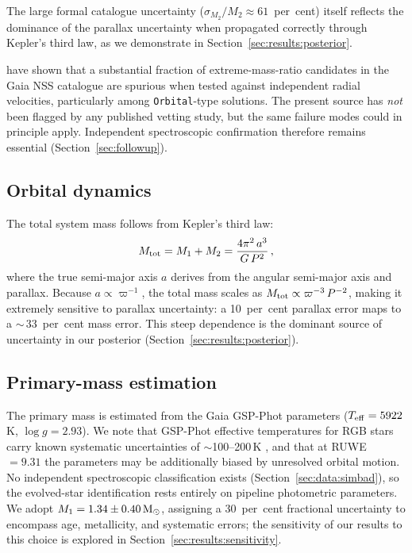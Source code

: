 \documentclass[usenatbib,fleqn]{mnras}
\newcommand{\Msun}{{\rm M}_\odot}
\begin{document}
The large formal catalogue uncertainty ($\sigma_{M_2}/M_2 \approx
61$~per~cent) itself reflects the dominance of the parallax
uncertainty when propagated correctly through Kepler's third law,
as we demonstrate in Section~\ref{sec:results:posterior}.

\citet{ElBadry2024} have shown that a substantial fraction of
extreme-mass-ratio candidates in the Gaia NSS catalogue are
spurious when tested against independent radial velocities,
particularly among \texttt{Orbital}-type solutions.  The
present source has \emph{not} been flagged by any published
vetting study, but the same failure modes could in
principle apply.  Independent spectroscopic confirmation therefore
remains essential (Section~\ref{sec:followup}).

\subsection{Orbital dynamics}
\label{sec:methods:orbit}

The total system mass follows from Kepler's third law:
\begin{equation}
M_{\rm tot} = M_1 + M_2 = \frac{4\pi^2\,a^3}{G\,P^2}\,,
\label{eq:kepler}
\end{equation}
where the true semi-major axis $a$ derives from the angular
semi-major axis and parallax.  Because
$a \propto \varpi^{-1}$, the total mass scales as
$M_{\rm tot} \propto \varpi^{-3}\,P^{-2}$, making it extremely
sensitive to parallax uncertainty: a 10~per~cent parallax error
maps to a $\sim$\,33~per~cent mass error.  This steep
dependence is the dominant source of uncertainty in our posterior
(Section~\ref{sec:results:posterior}).

\subsection{Primary-mass estimation}
\label{sec:methods:m1}

The primary mass is estimated from the Gaia GSP-Phot parameters
($T_{\rm eff} = 5922$\,K, $\log g = 2.93$).  We note that
GSP-Phot effective temperatures for RGB stars carry known
systematic uncertainties of $\sim$100--200\,K
\citep{Andrae2023}, and that at RUWE~$= 9.31$ the parameters
may be additionally biased by unresolved orbital motion.
No independent spectroscopic classification exists
(Section~\ref{sec:data:simbad}), so the evolved-star identification
rests entirely on pipeline photometric parameters.  We adopt
$M_1 = 1.34 \pm 0.40\,\Msun$, assigning a 30~per~cent
fractional uncertainty to encompass age, metallicity,
and systematic errors; the sensitivity of our results to this
choice is explored in Section~\ref{sec:results:sensitivity}.
\end{document}
